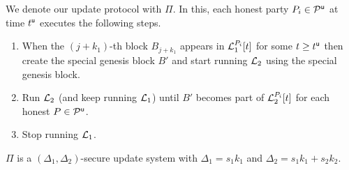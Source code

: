 We denote our update protocol with $\Pi$. In this, each honest party $P_i\in\mathcal{P}^\mathsf{u}$ at time $t^{\mathsf{u}}$ executes the following steps.

\begin{enumerate}
	
	\item When the $(j+k_1)$-th block $B_{j+k_1}$ appears in $\mathcal{L}_1^{P_i}[t]$ for some $t\geq t^{\mathsf{u}}$ then create the special genesis block $B'$
	and start running $\mathcal{L}_2$ using the special genesis block. 
	\item Run $\mathcal{L}_2$ (and keep running $\mathcal{L}_1$) until $B'$ becomes part of $\mathcal{L}_2^{P_i}[t]$ 
	for each honest $P\in\mathcal{P}^\mathsf{u}$.
	\item Stop running $\mathcal{L}_1$.
\end{enumerate}



\begin{theorem}
$\Pi$ is a $(\Delta_1,\Delta_2)$-secure update system with $\Delta_1=s_1 k_1$ and $\Delta_2=s_1 k_1 + s_2 k_2$.
\end{theorem}

